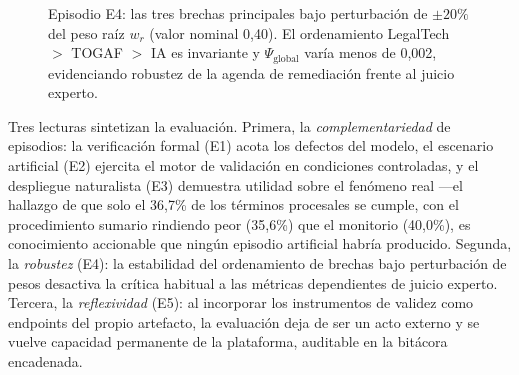 \documentclass[computers,article,submit,pdftex,moreauthors]{Definitions/mdpi}
\begin{document}
\begin{figure}[H]
\centering
{}
\caption{Episodio E4: las tres brechas principales bajo perturbación de $\pm 20\%$ del peso raíz $w_r$ (valor nominal 0{,}40). El ordenamiento LegalTech $>$ TOGAF $>$ IA es invariante y $\Psi_{\mathrm{global}}$ varía menos de 0{,}002, evidenciando robustez de la agenda de remediación frente al juicio experto.}
\label{fig:sens}
\end{figure}

Tres lecturas sintetizan la evaluación. Primera, la \emph{complementariedad} de episodios: la verificación formal (E1) acota los defectos del modelo, el escenario artificial (E2) ejercita el motor de validación en condiciones controladas, y el despliegue naturalista (E3) demuestra utilidad sobre el fenómeno real ---el hallazgo de que solo el 36{,}7\% de los términos procesales se cumple, con el procedimiento sumario rindiendo peor (35{,}6\%) que el monitorio (40{,}0\%), es conocimiento accionable que ningún episodio artificial habría producido. Segunda, la \emph{robustez} (E4): la estabilidad del ordenamiento de brechas bajo perturbación de pesos desactiva la crítica habitual a las métricas dependientes de juicio experto. Tercera, la \emph{reflexividad} (E5): al incorporar los instrumentos de validez como endpoints del propio artefacto, la evaluación deja de ser un acto externo y se vuelve capacidad permanente de la plataforma, auditable en la bitácora encadenada.
\end{document}
